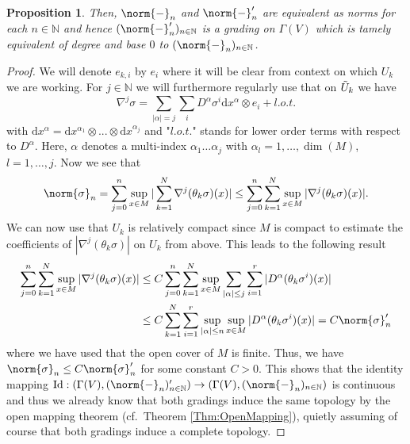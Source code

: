 \documentclass[12pt,a4paper]{article}
\theoremstyle{plain}
\newtheorem{proposition}[theorem]{Proposition}
\theoremstyle{definition}
\newcommand{\N}{\mathbb{N}}
\newcommand{\nnorm}[2]{\norm{#1}_{#2}}
\newcommand{\tens}{\otimes}
\renewcommand{\d}{\mathrm{d}}
\begin{document}
\begin{appendices}
\begin{proposition}
Then, $\nnorm{-}{n}$ and $\nnorm{-}{n}'$ are equivalent as norms for each $n\in \N$ and hence $(\nnorm{-}{n}')_{n\in \N}$ is a grading on $\Gamma(V)$ which is tamely equivalent of degree and base $0$ to $(\nnorm{-}{n})_{n\in \N}$.
\end{proposition}
\begin{proof}
We will denote $e_{k,i}$ by $e_i$ where it will be clear from context on which $U_k$ we are working. For $j\in \N$ we will furthermore regularly use that on $\Tilde{U}_k$ we have
\begin{equation*}
    \nabla^{j}\sigma = \sum_{|\alpha|=j}\sum_{i}D^{\alpha}\sigma^i \d x^{\alpha}\tens e_i + l.o.t.
\end{equation*}
with $\d x^{\alpha}=\d x^{\alpha_1}\tens...\tens \d x^{\alpha_j}$ and "$l.o.t.$" stands for lower order terms with respect to $D^{\alpha}$. Here, $\alpha$ denotes a multi-index $\alpha_1\ldots\alpha_j$ with $\alpha_l=1,\ldots,\dim(M)$, $l=1,\ldots,j$. 
Now we see that
\begin{equation*}
    \nnorm{\sigma}{n}= \sum_{j=0}^n\sup_{x\in M}|\sum_{k=1}^N\nabla^j(\theta_k\sigma)(x)| \leq \sum_{j=0}^n\sum_{k=1}^N\sup_{x\in M}|\nabla^j(\theta_k\sigma)(x)|.
\end{equation*}
We can now use that $U_k$ is relatively compact since $M$ is compact to estimate the coefficients of $|\nabla^j(\theta_k\sigma)|$ on $U_k$ from above. This leads to the following result
\begin{align*}
    \sum_{j=0}^n\sum_{k=1}^N\sup_{x\in M}|\nabla^j(\theta_k\sigma)(x)|&\leq C \sum_{j=0}^n\sum_{k=1}^N\sup_{x\in M}\sum_{|\alpha|\leq j}\sum_{i=1}^r|D^{\alpha}(\theta_k\sigma^i)(x)| \\
    &\leq C\sum_{k=1}^N\sum_{i=1}^r \sup_{|\alpha|\leq n}\sup_{x\in M}|D^{\alpha}(\theta_k\sigma^i)(x)|=C\nnorm{\sigma}{n}'
\end{align*}
where we have used that the open cover of $M$ is finite. Thus, we have $\nnorm{\sigma}{n}\leq C\nnorm{\sigma}{n}'$ for some constant $C>0$. This shows that the identity mapping $\mathrm{Id}:(\Gamma(V),(\nnorm{-}{n})_{n\in \N}')\to (\Gamma(V),(\nnorm{-}{n})_{n\in \N})$ is continuous and thus we already know that both gradings induce the same topology by the open mapping theorem (cf.~Theorem \ref{Thm:OpenMapping}), quietly assuming of course that both gradings induce a complete topology.


\end{proof}
\end{appendices}
\end{document}
